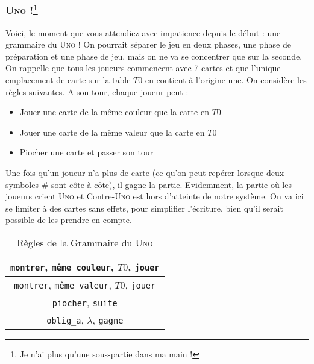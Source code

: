 \documentclass{cours}
\begin{document}
\subsubsection[\textsc{Uno !}]{\textsc{Uno !}\footnote{Je n'ai plus qu'une sous-partie dans ma main !}}
Voici, le moment que vous attendiez avec impatience depuis le début : une grammaire du \textsc{Uno} ! On pourrait séparer le jeu en deux phases, une phase de préparation et une phase de jeu, mais on ne va se concentrer que sur la seconde. \\
On rappelle que tous les joueurs commencent avec 7 cartes et que l'unique emplacement de carte sur la table $T0$ en contient à l'origine une. On considère les règles suivantes. A son tour, chaque joueur peut : 
\begin{itemize}
    \item Jouer une carte de la même couleur que la carte en $T0$
    \item Jouer une carte de la même valeur que la carte en $T0$
    \item Piocher une carte et passer son tour
\end{itemize}
Une fois qu'un joueur n'a plus de carte (ce qu'on peut repérer lorsque deux symboles \# sont côte à côte), il gagne la partie. Evidemment, la partie où les joueurs crient \textsc{Uno} et Contre-\textsc{Uno} est hors d'atteinte de notre système. On va ici se limiter à des cartes sans effets, pour simplifier l'écriture, bien qu'il serait possible de les prendre en compte. 
\begin{table}
    \centering
    \caption{Règles de la Grammaire du \textsc{Uno}}
    \label{table:grammar_uno}
    \begin{tabular}{c}
        \toprule
        \texttt{montrer}, \texttt{même couleur}, $T0$, \texttt{jouer}\\
        \midrule
        \texttt{montrer}, \texttt{même valeur}, $T0$, \texttt{jouer}\\
        \midrule
        \texttt{piocher}, \texttt{suite}\\
        \midrule
        \texttt{oblig\_a}, $\lambda$, \texttt{gagne}\\
        \bottomrule
    \end{tabular}
\end{table}
\end{document}

